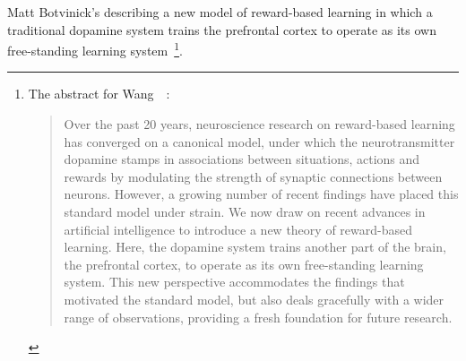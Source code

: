 Matt Botvinick's {} describing a new model of reward-based learning in which a traditional dopamine system trains the prefrontal cortex to operate as its own free-standing learning system~\cite{WangetalNATURE-NEUROSCIENCE-18}\footnote{%
%
  The abstract for Wang~\etal{}~\cite{WangetalNATURE-NEUROSCIENCE-18}:
%
  \begin{quotation}
%
   Over the past 20 years, neuroscience research on reward-based learning has converged on a canonical model, under which the neurotransmitter dopamine stamps in associations between situations, actions and rewards by modulating the strength of synaptic connections between neurons. However, a growing number of recent findings have placed this standard model under strain. We now draw on recent advances in artificial intelligence to introduce a new theory of reward-based learning. Here, the dopamine system trains another part of the brain, the prefrontal cortex, to operate as its own free-standing learning system. This new perspective accommodates the findings that motivated the standard model, but also deals gracefully with a wider range of observations, providing a fresh foundation for future research.
%
  \end{quotation}}.

